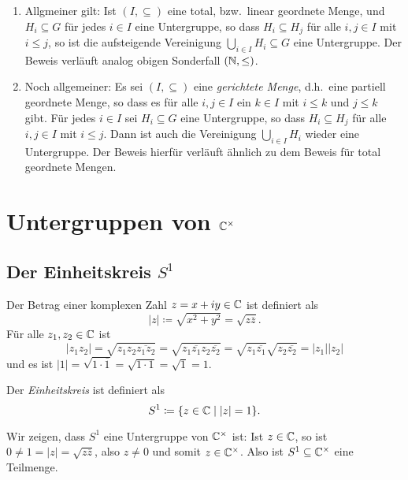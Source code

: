 \begin{bem}
 \begin{enumerate}[leftmargin=*]
  \item
   Allgmeiner gilt: Ist $(I, \subseteq)$ eine total, bzw.\ linear geordnete Menge, und $H_i \subseteq G$ für jedes $i \in I$ eine Untergruppe, so dass $H_i \subseteq H_j$ für alle $i,j \in I$ mit $i \leq j$, so ist die aufsteigende Vereinigung $\bigcup_{i \in I} H_i \subseteq G$ eine Untergruppe. Der Beweis verläuft analog obigen Sonderfall $(\mathbb{N}, \leq)$.
  \item
   Noch allgemeiner: Es sei $(I, \subseteq)$ eine \emph{gerichtete Menge}, d.h.\ eine partiell geordnete Menge, so dass es für alle $i,j \in I$ ein $k \in I$ mit $i \leq k$ und $j \leq k$ gibt. Für jedes $i \in I$ sei $H_i \subseteq G$ eine Untergruppe, so dass $H_i \subseteq H_j$ für alle $i,j \in I$ mit $i \leq j$. Dann ist auch die Vereinigung $\bigcup_{i \in I} H_i$ wieder eine Untergruppe. Der Beweis hierfür verläuft ähnlich zu dem Beweis für total geordnete Mengen.
 \end{enumerate}
\end{bem}





\section{Untergruppen von \texorpdfstring{$\mathbb{C}^\times$}{Cx}}



\subsection{Der Einheitskreis \texorpdfstring{$S^1$}{S1}}
Der Betrag einer komplexen Zahl $z = x+iy \in \mathbb{C}$ ist definiert als
\[
 |z| \coloneqq \sqrt{x^2+y^2} = \sqrt{z \overline{z}}.
\]
Für alle $z_1, z_2 \in \mathbb{C}$ ist
\[
 |z_1 z_2|
 = \sqrt{z_1 z_2 \overline{z_1 z_2}}
 = \sqrt{z_1 \overline{z_1} z_2 \overline{z_2}}
 = \sqrt{z_1 \overline{z_1}} \sqrt{z_2 \overline{z_2}}
 = |z_1| |z_2|
\]
und es ist $|1| = \sqrt{1 \cdot \overline{1}} = \sqrt{1 \cdot 1} = \sqrt{1} = 1$.

\begin{defi}
 Der \emph{Einheitskreis} ist definiert als
\[
 S^1 \coloneqq \{z \in \mathbb{C} \mid |z| = 1\}.
\]
\end{defi}


Wir zeigen, dass $S^1$ eine Untergruppe von $\mathbb{C}^\times$ ist: Ist $z \in \mathbb{C}$, so ist $0 \neq 1 = |z| = \sqrt{z \overline{z}}$, also $z \neq 0$ und somit $z \in \mathbb{C}^\times$. Also ist $S^1 \subseteq \mathbb{C}^\times$ eine Teilmenge.

